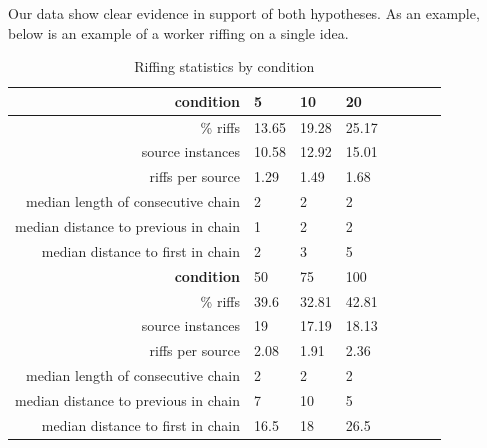 Our data show clear evidence in support of both hypotheses. As an example, below is an example of a worker riffing on a single idea.




\begin{table}
\begin{tabular}[h!]{r | l l l l l l l}
    \hline \hline \textbf{condition} & 5 & 10 & 20  \\ \hline \hline
    \% riffs & 13.65 & 19.28 & 25.17  \\
    source instances & 10.58 & 12.92 & 15.01 \\
    riffs per source & 1.29 & 1.49 & 1.68 \\
    median length of consecutive chain & 2 & 2 & 2 \\
    median distance to previous in chain & 1 & 2 & 2 \\
    median distance to first in chain & 2 & 3 & 5 \\ \hline \hline
    \textbf{condition} & 50 & 75 & 100 \\ \hline \hline
    \% riffs & 39.6 & 32.81 & 42.81 \\
    source instances & 19 & 17.19 & 18.13\\
    riffs per source & 2.08 & 1.91 & 2.36\\
    median length of consecutive chain & 2 & 2 & 2\\
    median distance to previous in chain & 7 & 10 & 5\\
    median distance to first in chain & 16.5 & 18 & 26.5 \\
    \end{tabular}
    \caption{Riffing statistics by condition}
\end{table}

